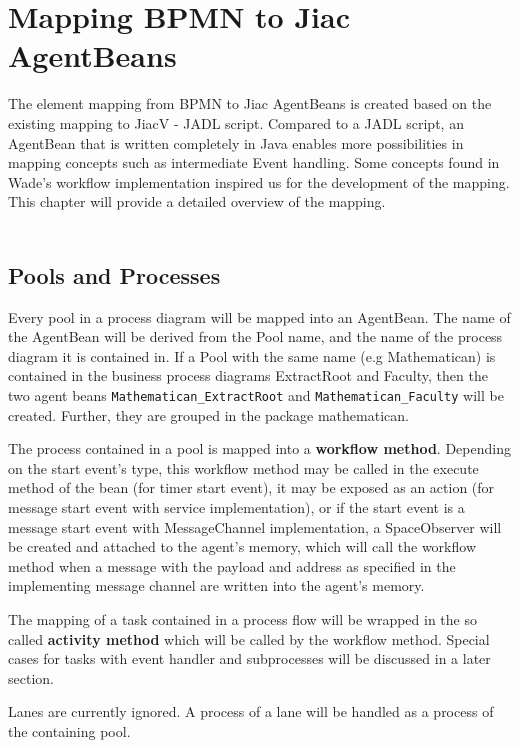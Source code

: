 \chapter{Mapping BPMN to Jiac AgentBeans}
\label{chap:mapping}
The element mapping from BPMN to Jiac AgentBeans is created based on the existing mapping to JiacV - JADL script. Compared to a JADL script, an AgentBean that is written completely in Java enables more possibilities in mapping concepts such as intermediate Event handling. Some concepts found in Wade's workflow implementation inspired us for the development of the mapping. This chapter will provide a detailed overview of the mapping.\\\\

\section{Pools and Processes}
Every pool in a process diagram will be mapped into an AgentBean. The name of the AgentBean will be derived from the Pool name, and the name of the process diagram it is contained in. If a Pool with the same name (e.g Mathematican) is contained in the business process diagrams ExtractRoot and Faculty, then the two agent beans \texttt{Mathematican\_ExtractRoot} and \texttt{Mathematican\_Faculty} will be created. Further, they are grouped in the package mathematican. 

The process contained in a pool is mapped into a \textbf{workflow method}. Depending on the start event's type, this workflow method may be called in the execute method of the bean (for timer start event), it may be exposed as an action (for message start event with service implementation), or if the start event is a message start event with MessageChannel implementation, a SpaceObserver will be created and attached to the agent's memory, which will call the workflow method when a message with the payload and address as specified in the implementing message channel are written into the agent's memory.

The mapping of a task contained in a process flow will be wrapped in the so called \textbf{activity method} which will be called by the workflow method. Special cases for tasks with event handler and subprocesses will be discussed in a later section.

Lanes are currently ignored. A process of a lane will be handled as a process of the containing pool.

